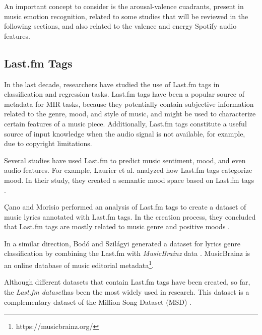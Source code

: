 \documentclass[sn-mathphys]{sn-jnl}%
\theoremstyle{thmstyleone}%
\theoremstyle{thmstyletwo}%
\theoremstyle{thmstylethree}%
\begin{document}
An important concept to consider is the arousal-valence cuadrants, present in music emotion recognition,
related to some studies that will be reviewed in the following sections, and also related to the valence and energy
Spotify audio features.

\subsection{Last.fm Tags}

In the last decade, researchers have studied the use of Last.fm tags in classification and regression tasks.
Last.fm tags have been a popular source of metadata for MIR tasks,
because they potentially contain subjective information related to the genre, mood, and style of music,
and might be used to characterize certain features of a music piece.
Additionally, Last.fm tags constitute a useful source of input knowledge when the audio signal is not available,
for example, due to copyright limitations.


Several studies have used Last.fm to predict music sentiment, mood, and even audio features.
For example, Laurier et al. analyzed how Last.fm tags categorize mood.
In their study, they created a semantic mood space based on Last.fm tags \cite{laurier2009music}.



{\c{C}}ano and Morisio performed an analysis of Last.fm tags to create a dataset of music
lyrics annotated with Last.fm tags.
In the creation process, they concluded that Last.fm tags are mostly related to music genre
and positive moods \cite{ccano2017music}.

In a similar direction, Bod{\'o} and Szil{\'a}gyi generated a dataset for lyrics genre classification
by combining the Last.fm with \emph{MusicBrainz} data \cite{bodo2018connecting}.
MusicBrainz is an online database of music editorial metadata\footnote[1]{https://musicbrainz.org/}.

Although different datasets that contain Last.fm tags have been created, so far,
the \emph{Last.fm dataset}\footnotemark[2] has been the most widely used in research.
This dataset is a complementary dataset of the Million Song Dataset (MSD) \cite{Bertin-Mahieux2011}.
\end{document}
